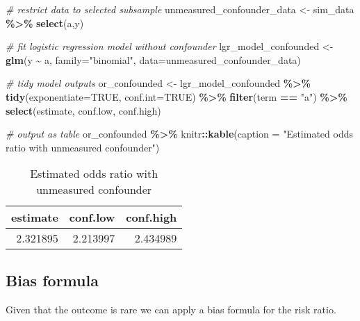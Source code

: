 \documentclass[
]{book}
\newenvironment{Shaded}{\begin{snugshade}}{\end{snugshade}}
\newcommand{\AttributeTok}[1]{\textcolor[rgb]{0.13,0.29,0.53}{#1}}
\newcommand{\CommentTok}[1]{\textcolor[rgb]{0.56,0.35,0.01}{\textit{#1}}}
\newcommand{\ConstantTok}[1]{\textcolor[rgb]{0.56,0.35,0.01}{#1}}
\newcommand{\FunctionTok}[1]{\textcolor[rgb]{0.13,0.29,0.53}{\textbf{#1}}}
\newcommand{\NormalTok}[1]{#1}
\newcommand{\OtherTok}[1]{\textcolor[rgb]{0.56,0.35,0.01}{#1}}
\newcommand{\SpecialCharTok}[1]{\textcolor[rgb]{0.81,0.36,0.00}{\textbf{#1}}}
\newcommand{\StringTok}[1]{\textcolor[rgb]{0.31,0.60,0.02}{#1}}
\begin{document}
\begin{Shaded}
\begin{Highlighting}[]
\CommentTok{\# restrict data to selected subsample}
\NormalTok{unmeasured\_confounder\_data }\OtherTok{\textless{}{-}}\NormalTok{ sim\_data }\SpecialCharTok{\%\textgreater{}\%} \FunctionTok{select}\NormalTok{(a,y)}

\CommentTok{\# fit logistic regression model without confounder}
\NormalTok{lgr\_model\_confounded }\OtherTok{\textless{}{-}} \FunctionTok{glm}\NormalTok{(y }\SpecialCharTok{\textasciitilde{}}\NormalTok{ a, }\AttributeTok{family=}\StringTok{"binomial"}\NormalTok{, }\AttributeTok{data=}\NormalTok{unmeasured\_confounder\_data)}

\CommentTok{\# tidy model outputs}
\NormalTok{or\_confounded }\OtherTok{\textless{}{-}}\NormalTok{ lgr\_model\_confounded }\SpecialCharTok{\%\textgreater{}\%} 
  \FunctionTok{tidy}\NormalTok{(}\AttributeTok{exponentiate=}\ConstantTok{TRUE}\NormalTok{, }\AttributeTok{conf.int=}\ConstantTok{TRUE}\NormalTok{) }\SpecialCharTok{\%\textgreater{}\%} 
  \FunctionTok{filter}\NormalTok{(term }\SpecialCharTok{==} \StringTok{"a"}\NormalTok{) }\SpecialCharTok{\%\textgreater{}\%} 
  \FunctionTok{select}\NormalTok{(estimate, conf.low, conf.high) }

\CommentTok{\# output as table}
\NormalTok{or\_confounded }\SpecialCharTok{\%\textgreater{}\%}
\NormalTok{  knitr}\SpecialCharTok{::}\FunctionTok{kable}\NormalTok{(}\AttributeTok{caption =} \StringTok{"Estimated odds ratio with unmeasured confounder"}\NormalTok{)}
\end{Highlighting}
\end{Shaded}

\begin{table}

\caption{\label{tab:unnamed-chunk-18}Estimated odds ratio with unmeasured confounder}
\centering
\begin{tabular}[t]{r|r|r}
\hline
estimate & conf.low & conf.high\\
\hline
2.321895 & 2.213997 & 2.434989\\
\hline
\end{tabular}
\end{table}

\hypertarget{bias-formula}{%
\subsection{Bias formula}\label{bias-formula}}

Given that the outcome is rare we can apply a bias formula for the risk ratio.
\end{document}
